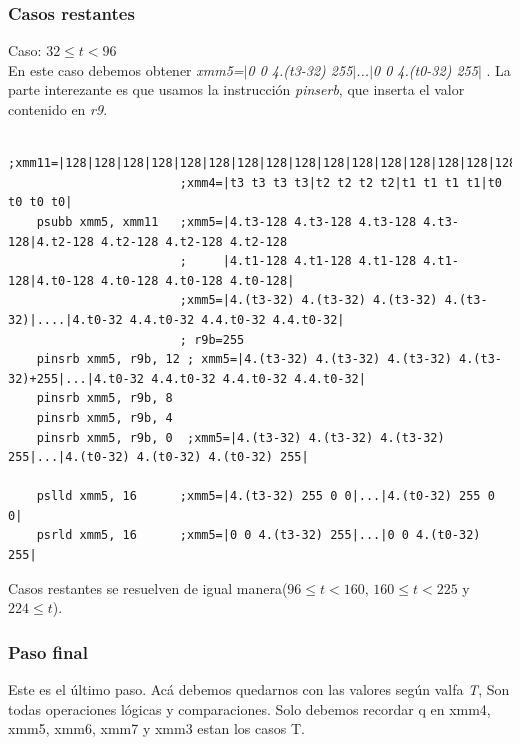 \subsubsection*{Casos restantes}
Caso: $32 \leq t < 96$ \\
En este caso debemos obtener \emph{xmm5=$|$0 0 4.(t3-32) 255$|$...$|$0 0 4.(t0-32) 255$|$ }. 
La parte interezante es que usamos la instrucción \emph{pinserb}, que inserta el valor contenido en \emph{r9}.
\begin{codesnippet}
\begin{verbatim}				
                        ;xmm11=|128|128|128|128|128|128|128|128|128|128|128|128|128|128|128|128|
                        ;xmm4=|t3 t3 t3 t3|t2 t2 t2 t2|t1 t1 t1 t1|t0 t0 t0 t0|
    psubb xmm5, xmm11   ;xmm5=|4.t3-128 4.t3-128 4.t3-128 4.t3-128|4.t2-128 4.t2-128 4.t2-128 4.t2-128
                        ;     |4.t1-128 4.t1-128 4.t1-128 4.t1-128|4.t0-128 4.t0-128 4.t0-128 4.t0-128|
                        ;xmm5=|4.(t3-32) 4.(t3-32) 4.(t3-32) 4.(t3-32)|....|4.t0-32 4.4.t0-32 4.4.t0-32 4.4.t0-32|                           
                        ; r9b=255
    pinsrb xmm5, r9b, 12 ; xmm5=|4.(t3-32) 4.(t3-32) 4.(t3-32) 4.(t3-32)+255|...|4.t0-32 4.4.t0-32 4.4.t0-32 4.4.t0-32|
    pinsrb xmm5, r9b, 8  
    pinsrb xmm5, r9b, 4
    pinsrb xmm5, r9b, 0  ;xmm5=|4.(t3-32) 4.(t3-32) 4.(t3-32) 255|...|4.(t0-32) 4.(t0-32) 4.(t0-32) 255|                    

    pslld xmm5, 16      ;xmm5=|4.(t3-32) 255 0 0|...|4.(t0-32) 255 0 0|
    psrld xmm5, 16      ;xmm5=|0 0 4.(t3-32) 255|...|0 0 4.(t0-32) 255|                    
\end{verbatim}
\end{codesnippet}

Casos restantes se resuelven de igual manera($96\leq t < 160$, $160\leq t <225$ y  $224 \leq t$).

\subsubsection*{Paso final}

Este es el último paso. Acá debemos quedarnos con las valores según valfa \emph{T}, Son todas operaciones lógicas y comparaciones. Solo debemos recordar q en xmm4,  xmm5, xmm6, xmm7 y xmm3 estan los casos T.

